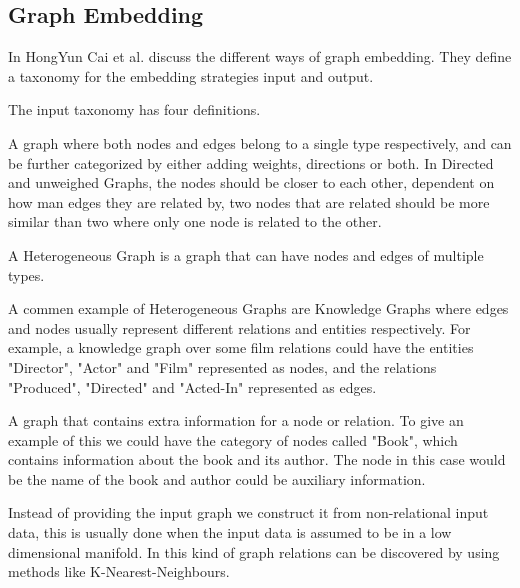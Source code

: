 \subsection{Graph Embedding}
In \cite{8294302} HongYun Cai et al. discuss the different ways of graph embedding. They define a taxonomy for the embedding strategies input and output.

The input taxonomy has four definitions.  

\begin{definition} A graph where both nodes and edges belong to a single type respectively, and can be further categorized by either adding weights, directions or both. In Directed and unweighed Graphs, the nodes should be closer to each other, dependent on how man edges they are related by, two nodes that are related should be more similar than two where only one node is related to the other\cite{8294302}.
\end{definition}

\begin{definition} A Heterogeneous Graph is a graph that can have nodes and edges of multiple types\cite{8294302}. 
\end{definition}

A commen example of Heterogeneous Graphs are Knowledge Graphs where edges and nodes usually represent different relations and entities respectively. For example, a knowledge graph over some film relations could have the entities "Director", "Actor" and "Film" represented as nodes, and the relations "Produced", "Directed" and "Acted-In" represented as edges.

\begin{definition} A graph that contains extra information for a node or relation. To give an example of this we could have the category of nodes called "Book", which contains information about the book and its author. The node in this case would be the name of the book and author could be auxiliary information\cite{8294302}.
\end{definition}

\begin{definition} Instead of providing the input graph we construct it from non-relational input data, this is usually done when the input data is assumed to be in a low dimensional manifold. In this kind of graph relations can be discovered by using methods like K-Nearest-Neighbours\cite{8294302}.
\end{definition}

